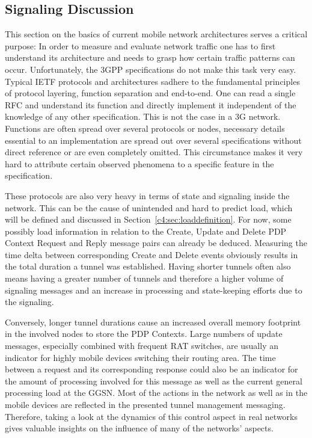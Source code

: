 \subsection{Signaling Discussion}

This section on the basics of current mobile network architectures serves a critical purpose: In order to measure and evaluate network traffic one has to first understand its architecture and needs to grasp how certain traffic patterns can occur. Unfortunately, the \gls{3GPP} specifications do not make this task very easy. Typical \gls{IETF} protocols and architectures sadhere to the fundamental principles of protocol layering, function separation and end-to-end. One can read a single \gls{RFC} and understand its function and directly implement it independent of the knowledge of any other specification. This is not the case in a \gls{3G} network. Functions are often spread over several protocols or nodes, necessary details essential to an implementation are spread out over several specifications without direct reference or are even completely omitted. This circumstance makes it very hard to attribute certain observed phenomena to a specific feature in the specification.

These protocols are also very heavy in terms of state and signaling inside the network. This can be the cause of unintended and hard to predict load, which will be defined and discussed in Section~\ref{c4:sec:loaddefinition}. For now, some possibly load information in relation to the Create, Update and Delete \gls{PDP} Context Request and Reply message pairs can already be deduced. Measuring the time delta between corresponding Create and Delete events obviously results in the total duration a tunnel was established. Having shorter tunnels often also means having a greater number of tunnels and therefore a higher volume of signaling messages and an increase in processing and state-keeping efforts due to the signaling. 

Conversely, longer tunnel durations cause an increased overall memory footprint in the involved nodes to store the \gls{PDP} Contexts. Large numbers of update messages, especially combined with frequent \gls{RAT} switches, are usually an indicator for highly mobile devices switching their routing area. The time between a request and its corresponding response could also be an indicator for the amount of processing involved for this message as well as the current general processing load at the \gls{GGSN}. Most of the actions in the network as well as in the mobile devices are reflected in the presented tunnel management messaging. Therefore, taking a look at the dynamics of this control aspect in real networks gives valuable insights on the influence of many of the networks' aspects.





